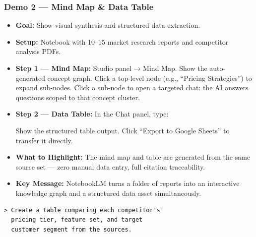 \begin{frame}[fragile]\frametitle{Demo 2 — Mind Map \& Data Table}
  \begin{itemize}
    \item \textbf{Goal:} Show visual synthesis and structured data extraction.
    \item \textbf{Setup:} Notebook with 10--15 market research reports and competitor analysis PDFs.
    \item \textbf{Step 1 — Mind Map:} Studio panel → Mind Map. Show the auto-generated concept graph. Click a top-level node (e.g., ``Pricing Strategies'') to expand sub-nodes. Click a sub-node to open a targeted chat: the AI answers questions scoped to that concept cluster.
    \item \textbf{Step 2 — Data Table:} In the Chat panel, type:

    Show the structured table output. Click ``Export to Google Sheets'' to transfer it directly.
    \item \textbf{What to Highlight:} The mind map and table are generated from the same source set — zero manual data entry, full citation traceability.
    \item \textbf{Key Message:} NotebookLM turns a folder of reports into an interactive knowledge graph and a structured data asset simultaneously.
  \end{itemize}
  
\begin{lstlisting}
> Create a table comparing each competitor's
  pricing tier, feature set, and target
  customer segment from the sources.
\end{lstlisting}  
\end{frame}

